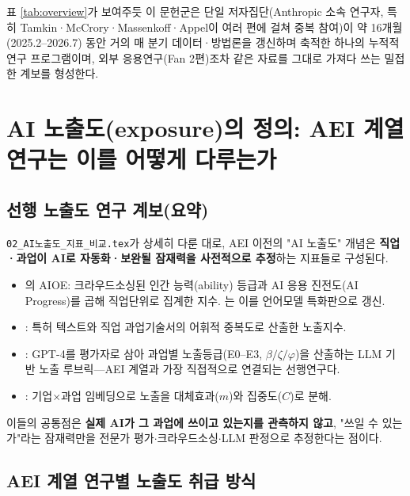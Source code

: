 \documentclass[11pt]{article}
\begin{document}
표 \ref{tab:overview}가 보여주듯 이 문헌군은 단일 저자집단(Anthropic 소속 연구자, 특히 Tamkin·McCrory·Massenkoff·Appel이 여러 편에 걸쳐 중복 참여)이 약 16개월(2025.2--2026.7) 동안 거의 매 분기 데이터·방법론을 갱신하며 축적한 하나의 누적적 연구 프로그램이며, 외부 응용연구(Fan 2편)조차 같은 자료를 그대로 가져다 쓰는 밀접한 계보를 형성한다.

\section{AI 노출도(exposure)의 정의: AEI 계열 연구는 이를 어떻게 다루는가}
\label{sec:exposure}

\subsection{선행 노출도 연구 계보(요약)}

\texttt{02\_AI노출도\_지표\_비교.tex}가 상세히 다룬 대로, AEI 이전의 "AI 노출도" 개념은 \textbf{직업·과업이 AI로 자동화·보완될 잠재력을 사전적으로 추정}하는 지표들로 구성된다.

\begin{itemize}[leftmargin=*]
  \item \citet{felten-2021-occupational-industry-and-geographic-exposure}의 AIOE: 크라우드소싱된 인간 능력(ability) 등급과 AI 응용 진전도(AI Progress)를 곱해 직업단위로 집계한 지수. \citet{felten-2023-how-will-language-modelers-like-chatgpt}는 이를 언어모델 특화판으로 갱신.
  \item \citet{webb-2020-impact-artificial-intelligence-labor}: 특허 텍스트와 직업 과업기술서의 어휘적 중복도로 산출한 노출지수.
  \item \citet{eloundou-2023-gpts-are-gpts-an-early}: GPT-4를 평가자로 삼아 과업별 노출등급(E0--E3, $\beta/\zeta/\varphi$)을 산출하는 LLM 기반 노출 루브릭—AEI 계열과 가장 직접적으로 연결되는 선행연구다.
  \item \citet{hampole-2025-artificial-intelligence-and-the-labor}: 기업$\times$과업 임베딩으로 노출을 대체효과($m$)와 집중도($C$)로 분해.
\end{itemize}

이들의 공통점은 \textbf{실제 AI가 그 과업에 쓰이고 있는지를 관측하지 않고}, "쓰일 수 있는가"라는 잠재력만을 전문가 평가$\cdot$크라우드소싱$\cdot$LLM 판정으로 추정한다는 점이다.

\subsection{AEI 계열 연구별 노출도 취급 방식}
\end{document}
